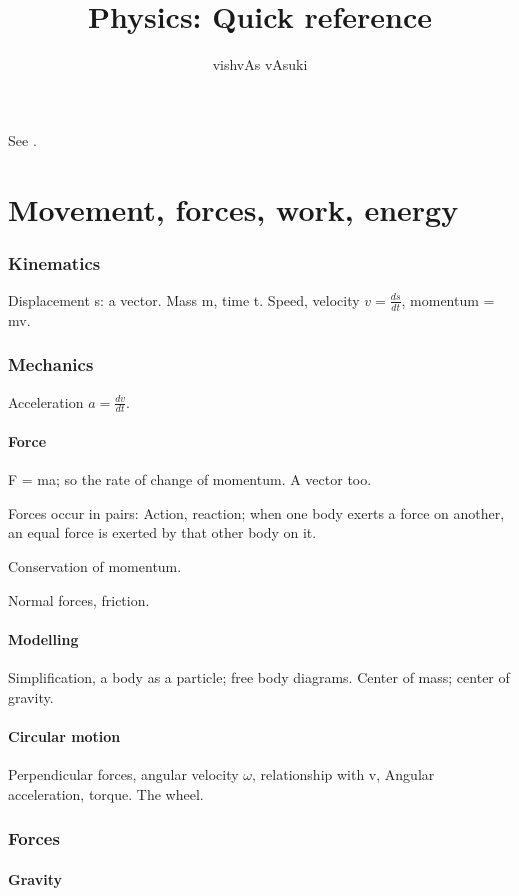 \documentclass{article}
\title{Physics: Quick reference}
\author{vishvAs vAsuki}
\begin{document}
\maketitle

See \cite{resnickHalliday}.

\part{Movement, forces, work, energy}
\section{Kinematics}
Displacement s: a vector. Mass m, time t. Speed, velocity $v = \frac{ds}{dt}$, momentum = mv.

\section{Mechanics}
Acceleration $a = \frac{dv}{dt}$.

\subsection{Force}
F = ma; so the rate of change of momentum. A vector too.

Forces occur in pairs: Action, reaction; when one body exerts a force on another, an equal force is exerted by that other body on it.

Conservation of momentum.

Normal forces, friction.

\subsection{Modelling}
Simplification, a body as a particle; free body diagrams. Center of mass; center of gravity.

\subsection{Circular motion}
Perpendicular forces, angular velocity $\omega$, relationship with v, Angular acceleration, torque. The wheel.

\section{Forces}
\subsection{Gravity}
\end{document}

